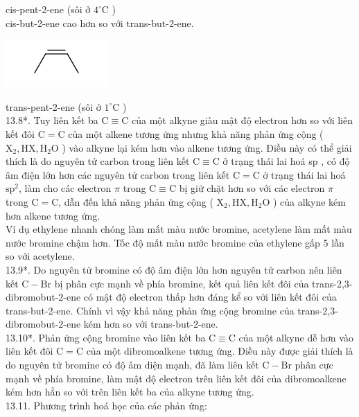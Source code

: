 \documentclass[10pt]{article}
\begin{document}
cis-pent-2-ene (sôi ở $4^{\circ} \mathrm{C}$ )\\
cis-but-2-ene cao hơn so với trans-but-2-ene.

\includegraphics{smile-61351a8c6a4d79d57e5bd55e93902354882981a7}

trans-pent-2-ene (sôi ở $1^{\circ} \mathrm{C}$ )\\
13.8*. Tuy liên kết ba $\mathrm{C} \equiv \mathrm{C}$ của một alkyne giàu mật độ electron hơn so với liên kết đôi $\mathrm{C}=\mathrm{C}$ của một alkene tương ứng nhưng khả năng phản ứng cộng ( $\mathrm{X}_{2}, \mathrm{HX}, \mathrm{H}_{2} \mathrm{O}$ ) vào alkyne lại kém hơn vào alkene tương ứng. Điều này có thể giải thích là do nguyên tử carbon trong liên kết $\mathrm{C} \equiv \mathrm{C}$ ở trạng thái lai hoá sp , có độ âm điện lớn hơn các nguyên tử carbon trong liên kết $\mathrm{C}=\mathrm{C}$ ở trạng thái lai hoá $\mathrm{sp}^{2}$, làm cho các electron $\pi$ trong $\mathrm{C} \equiv \mathrm{C}$ bị giữ chặt hơn so với các electron $\pi$ trong $\mathrm{C}=\mathrm{C}$, dẫn đến khả năng phản ứng cộng ( $\mathrm{X}_{2}, \mathrm{HX}, \mathrm{H}_{2} \mathrm{O}$ ) của alkyne kém hơn alkene tương ứng.\\
Ví dụ ethylene nhanh chóng làm mất màu nước bromine, acetylene làm mất màu nước bromine chậm hơn. Tốc độ mất màu nước bromine của ethylene gấp 5 lần so với acetylene.\\
13.9*. Do nguyên tử bromine có độ âm điện lớn hơn nguyên tử carbon nên liên kết $\mathrm{C}-\mathrm{Br}$ bị phân cực mạnh về phía bromine, kết quả liên kết đôi của trans-2,3-dibromobut-2-ene có mật độ electron thấp hơn đáng kể so với liên kết đôi của trans-but-2-ene. Chính vì vậy khả năng phản ứng cộng bromine của trans-2,3-dibromobut-2-ene kém hơn so với trans-but-2-ene.\\
13.10*. Phản ứng cộng bromine vào liên kết ba $\mathrm{C} \equiv \mathrm{C}$ của một alkyne dễ hơn vào liên kết đôi $\mathrm{C}=\mathrm{C}$ của một dibromoalkene tương ứng. Điều này được giải thích là do nguyên tử bromine có độ âm diện mạnh, đã làm liên kết $\mathrm{C}-\mathrm{Br}$ phân cực mạnh về phía bromine, làm mật độ electron trên liên kết đôi của dibromoalkene kém hơn hẳn so với trên liên kết ba của alkyne tương ứng.\\
13.11. Phương trình hoá học của các phản ứng:\\
\end{document}
